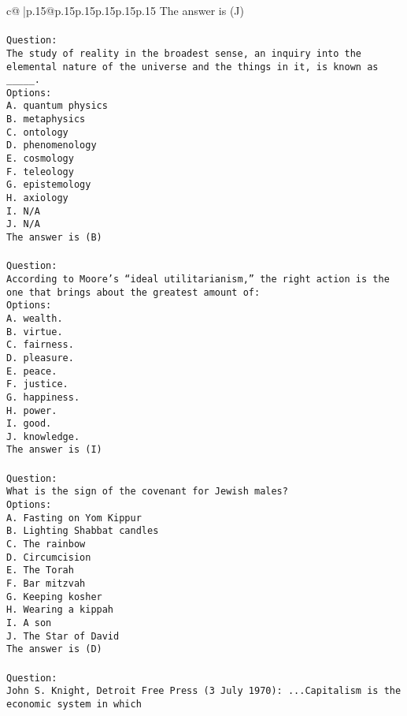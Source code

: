 \documentclass{article}
\begin{document}
{\begin{supertabular}{c@{$\;$}|p{.15\linewidth}@{}p{.15\linewidth}p{.15\linewidth}p{.15\linewidth}p{.15\linewidth}p{.15\linewidth}}
{{{The answer is (J)\\ \tt \\ \tt Question:\\ \tt The study of reality in the broadest sense, an inquiry into the elemental nature of the universe and the things in it, is known as _____.\\ \tt Options:\\ \tt A. quantum physics\\ \tt B. metaphysics\\ \tt C. ontology\\ \tt D. phenomenology\\ \tt E. cosmology\\ \tt F. teleology\\ \tt G. epistemology\\ \tt H. axiology\\ \tt I. N/A\\ \tt J. N/A\\ \tt The answer is (B)\\ \tt \\ \tt Question:\\ \tt According to Moore’s “ideal utilitarianism,” the right action is the one that brings about the greatest amount of:\\ \tt Options:\\ \tt A. wealth.\\ \tt B. virtue.\\ \tt C. fairness.\\ \tt D. pleasure.\\ \tt E. peace.\\ \tt F. justice.\\ \tt G. happiness.\\ \tt H. power.\\ \tt I. good.\\ \tt J. knowledge.\\ \tt The answer is (I)\\ \tt \\ \tt Question:\\ \tt What is the sign of the covenant for Jewish males?\\ \tt Options:\\ \tt A. Fasting on Yom Kippur\\ \tt B. Lighting Shabbat candles\\ \tt C. The rainbow\\ \tt D. Circumcision\\ \tt E. The Torah\\ \tt F. Bar mitzvah\\ \tt G. Keeping kosher\\ \tt H. Wearing a kippah\\ \tt I. A son\\ \tt J. The Star of David\\ \tt The answer is (D)\\ \tt \\ \tt Question:\\ \tt John S. Knight, Detroit Free Press (3 July 1970): ...Capitalism is the economic system in which }}}
\end{supertabular}}
\end{document}
